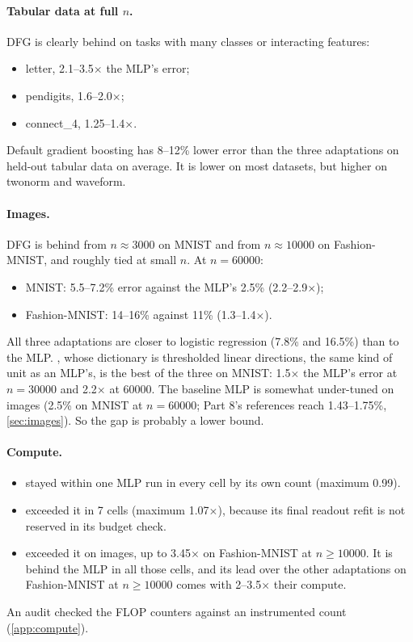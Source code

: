 \paragraph{Tabular data at full $n$.} DFG is clearly behind on tasks with many classes or interacting features:
\begin{itemize}
\item letter, 2.1--3.5$\times$ the MLP's error;
\item pendigits, 1.6--2.0$\times$;
\item connect\_4, 1.25--1.4$\times$.
\end{itemize}
Default gradient boosting has 8--12\% lower error than the three adaptations on held-out tabular data on average. It is lower on most datasets, but higher on twonorm and waveform.

\paragraph{Images.} DFG is behind from $n\approx3000$ on MNIST and from $n\approx10000$ on Fashion-MNIST, and roughly tied at small $n$. At $n=60000$:
\begin{itemize}
\item MNIST: 5.5--7.2\% error against the MLP's 2.5\% (2.2--2.9$\times$);
\item Fashion-MNIST: 14--16\% against 11\% (1.3--1.4$\times$).
\end{itemize}
All three adaptations are closer to logistic regression (7.8\% and 16.5\%) than to the MLP. , whose dictionary is thresholded linear directions, the same kind of unit as an MLP's, is the best of the three on MNIST: 1.5$\times$ the MLP's error at $n=30000$ and 2.2$\times$ at 60000. The baseline MLP is somewhat under-tuned on images (2.5\% on MNIST at $n=60000$; Part 8's references reach 1.43--1.75\%, \cref{sec:images}). So the gap is probably a lower bound.

\paragraph{Compute.}
\begin{itemize}
\item {} stayed within one MLP run in every cell by its own count (maximum 0.99).
\item {} exceeded it in 7 cells (maximum 1.07$\times$), because its final readout refit is not reserved in its budget check.
\item {} exceeded it on images, up to 3.45$\times$ on Fashion-MNIST at $n\ge10000$. It is behind the MLP in all those cells, and its lead over the other adaptations on Fashion-MNIST at $n\ge10000$ comes with 2--3.5$\times$ their compute.
\end{itemize}
An audit checked the FLOP counters against an instrumented count (\cref{app:compute}).

